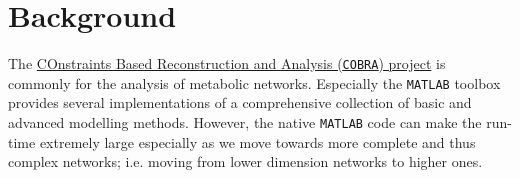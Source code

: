 \documentclass[a4paper, 12pt]{article}
\def\volesti{{\tt volesti}}
\begin{document}









\section{Background}

The \textcolor{blue}{\href{https://opencobra.github.io/}{COnstraints Based Reconstruction and Analysis (\texttt{COBRA}) project}} is commonly for the analysis of metabolic networks. Especially the {\tt MATLAB} toolbox provides several implementations of a comprehensive collection of basic and advanced modelling methods. However, the native {\tt MATLAB} code can make the run-time extremely large especially as we move towards more complete and thus complex networks; i.e. moving from lower dimension networks to higher ones.
\end{document}
